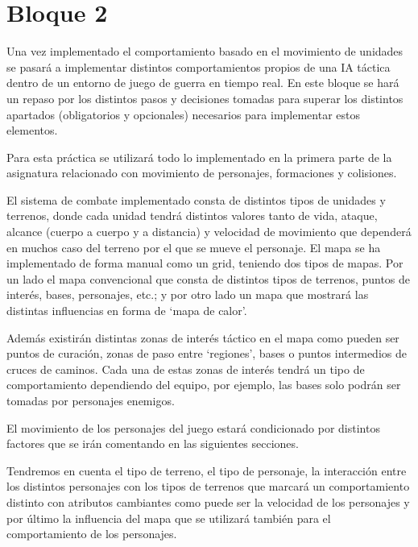 \part{Bloque 2}

 Una vez implementado el comportamiento basado  en el movimiento de unidades se pasará a implementar distintos comportamientos propios de una IA táctica dentro de un entorno de juego de guerra en tiempo real.  En este bloque se hará un repaso por los distintos pasos y decisiones tomadas para superar los distintos apartados (obligatorios y opcionales) necesarios para implementar estos elementos.

Para esta práctica se utilizará todo lo implementado en la primera parte de la asignatura relacionado con movimiento de personajes, formaciones y colisiones.

El sistema de combate implementado consta de distintos tipos de unidades y terrenos, donde cada unidad tendrá distintos valores tanto de vida, ataque, alcance (cuerpo a cuerpo y a distancia) y velocidad de movimiento que dependerá en muchos caso del terreno por el que se mueve el personaje. El mapa se ha implementado de forma manual como un grid, teniendo dos tipos de mapas. Por un lado el mapa convencional que consta de distintos tipos de terrenos, puntos de interés, bases, personajes, etc.; y por otro lado un mapa que mostrará las distintas influencias en forma de `mapa de calor'.

Además  existirán distintas zonas de interés táctico en el mapa como pueden ser puntos de curación, zonas de paso entre `regiones', bases o puntos intermedios de cruces de caminos. Cada una de estas zonas de interés tendrá un tipo de comportamiento dependiendo del equipo, por ejemplo, las bases solo podrán ser tomadas por personajes enemigos.

El movimiento de los personajes del juego estará condicionado por distintos factores que se irán comentando en las siguientes secciones.

Tendremos en cuenta el tipo de terreno, el tipo de personaje, la interacción entre los distintos personajes con los tipos de terrenos que marcará un comportamiento distinto con atributos cambiantes como puede ser la velocidad de los personajes y por último la influencia del mapa que se utilizará también para el comportamiento de los personajes.

